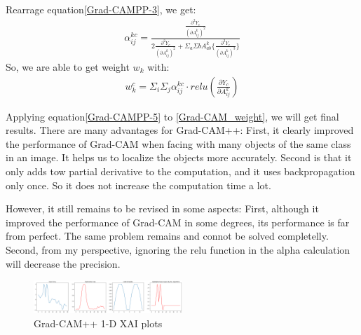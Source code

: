 \documentclass[conference]{IEEEtran}
\begin{document}
Rearrage equation\ref{Grad-CAMPP-3}, we get:
    \begin{equation}
        \begin{aligned}
\alpha_{ij}^{kc}=\frac{\frac{\partial^{2} Y_{c}}{(\partial A_{ij}^{k})^{2}}}{2\frac{\partial^{2} Y_{c}}{(\partial A_{ij}^{k})^{2}}+\Sigma_{a}\Sigma{b}A_{ab}^{k}\{\frac{\partial^{3} Y_{c}}{(\partial A_{ij}^{k})^{3}}\}}
            \label{Grad-CAMPP-4}
        \end{aligned}
        \end{equation}
So, we are able to get weight $w_{k}$ with:
\begin{equation}
    \begin{aligned}
        w_{k}^{c}=\Sigma_{i}\Sigma_{j}\alpha_{ij}^{kc}·relu(\frac{\partial Y_{c}}{\partial A_{ij}^{k}})
        \label{Grad-CAMPP-5}
    \end{aligned}
    \end{equation}

Applying equation\ref{Grad-CAMPP-5} to \ref{Grad-CAM_weight}, we will get final results.
There are many advantages for Grad-CAM++: First, it clearly improved the performance of Grad-CAM when facing with many objects of the same class in an image. It helps us to localize the objects more accurately. 
Second is that it only adds tow partial derivative to the computation, and it uses backpropagation only once. So it does not increase the computation time a lot.\par
However, it still remains to be revised in some aspects: First, although it improved the performance of Grad-CAM in some degrees, its performance is far from perfect. The same problem remains and connot be solved completelly. 
Second, from my perspective, ignoring the relu function in the alpha calculation will decrease the precision.\par

\begin{figure}[h] 
    \centering
    \includegraphics[width=0.5\textwidth]{gpd.png}
    \caption{Grad-CAM++ 1-D XAI plots} 
\end{figure}
\end{document}
